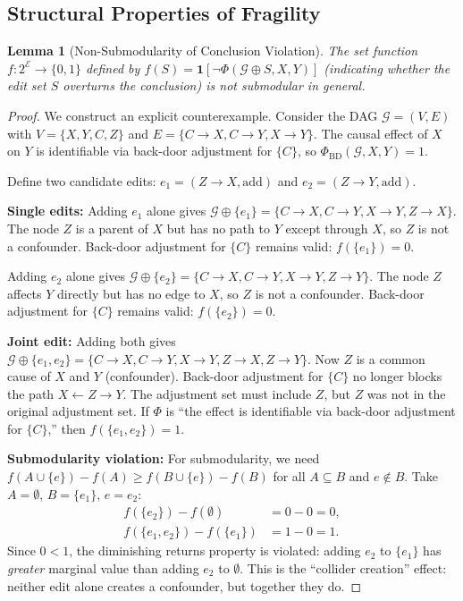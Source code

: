 \documentclass[11pt,a4paper]{article}
\newtheorem{lemma}[theorem]{Lemma}
\theoremstyle{definition}
\theoremstyle{remark}
\newcommand{\DAG}{\mathcal{G}}
\newcommand{\Phi}{\varPhi}
\begin{document}
\subsection{Structural Properties of Fragility}\label{sec:fragility_properties}

\begin{lemma}[Non-Submodularity of Conclusion Violation]\label{lem:non_submod}
The set function $f : 2^{\mathcal{E}} \to \{0, 1\}$ defined by
$f(S) = \mathbf{1}[\neg\Phi(\DAG \oplus S, X, Y)]$ (indicating whether
the edit set $S$ overturns the conclusion) is \emph{not} submodular
in general.
\end{lemma}

\begin{proof}
We construct an explicit counterexample. Consider the DAG
$\DAG = (V, E)$ with $V = \{X, Y, C, Z\}$ and
$E = \{C \to X, C \to Y, X \to Y\}$. The causal effect of $X$ on $Y$
is identifiable via back-door adjustment for $\{C\}$, so
$\Phi_{\mathrm{BD}}(\DAG, X, Y) = 1$.

Define two candidate edits:
$e_1 = (Z \to X, \mathrm{add})$ and $e_2 = (Z \to Y, \mathrm{add})$.

\textbf{Single edits:} Adding $e_1$ alone gives
$\DAG \oplus \{e_1\} = \{C \to X, C \to Y, X \to Y, Z \to X\}$.
The node $Z$ is a parent of $X$ but has no path to $Y$ except through $X$,
so $Z$ is not a confounder. Back-door adjustment for $\{C\}$ remains valid:
$f(\{e_1\}) = 0$.

Adding $e_2$ alone gives
$\DAG \oplus \{e_2\} = \{C \to X, C \to Y, X \to Y, Z \to Y\}$.
The node $Z$ affects $Y$ directly but has no edge to $X$, so $Z$ is not a
confounder. Back-door adjustment for $\{C\}$ remains valid:
$f(\{e_2\}) = 0$.

\textbf{Joint edit:} Adding both gives
$\DAG \oplus \{e_1, e_2\} = \{C \to X, C \to Y, X \to Y, Z \to X, Z \to Y\}$.
Now $Z$ is a common cause of $X$ and $Y$ (confounder). Back-door adjustment for
$\{C\}$ no longer blocks the path $X \leftarrow Z \to Y$. The adjustment set
must include $Z$, but $Z$ was not in the original adjustment set. If $\Phi$
is ``the effect is identifiable via back-door adjustment for $\{C\}$,'' then
$f(\{e_1, e_2\}) = 1$.

\textbf{Submodularity violation:} For submodularity, we need
$f(A \cup \{e\}) - f(A) \geq f(B \cup \{e\}) - f(B)$ for all $A \subseteq B$
and $e \notin B$. Take $A = \emptyset$, $B = \{e_1\}$, $e = e_2$:
\begin{align*}
  f(\{e_2\}) - f(\emptyset) &= 0 - 0 = 0, \\
  f(\{e_1, e_2\}) - f(\{e_1\}) &= 1 - 0 = 1.
\end{align*}
Since $0 < 1$, the diminishing returns property is violated: adding $e_2$ to
$\{e_1\}$ has \emph{greater} marginal value than adding $e_2$ to $\emptyset$.
This is the ``collider creation'' effect: neither edit alone creates a
confounder, but together they do.
\end{proof}
\end{document}
